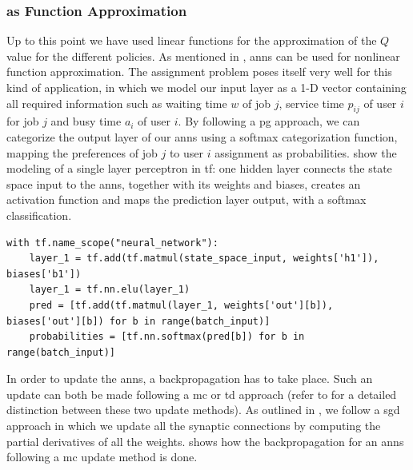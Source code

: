 \subsubsection{ as Function Approximation}

Up to this point we have used linear functions for the approximation of the $Q$ value for the different policies. As mentioned in , \glspl{ann} can be used for nonlinear function approximation. The assignment problem  poses itself very well for this kind of application, in which we model our input layer as a 1-D vector containing all required information such as waiting time $w$ of job $j$, service time $p_{ij}$ of user $i$ for job $j$ and busy time $a_i$ of user $i$. By following a \gls{pg} approach, we can categorize the output layer of our \glspl{ann} using a softmax categorization function, mapping the preferences of job $j$ to user $i$ assignment as probabilities.  show the modeling of a single layer perceptron in \gls{tf}: one hidden layer connects the state space \ie input to the \glspl{ann}, together with its weights and biases, creates an activation function and maps the prediction layer \ie output, with a softmax classification.

\begin{lstlisting}[caption={Modeling of a single perceptron in \glsentryshort{tf}, where the initial hidden layer is composed as the product between the input layer and its corresponding weights plus the corresponding biases by using an \glsentryshort{elu} activation function.},label=lst:ann_1h,style=CustomPython]
with tf.name_scope("neural_network"):
	layer_1 = tf.add(tf.matmul(state_space_input, weights['h1']), biases['b1'])
	layer_1 = tf.nn.elu(layer_1)
	pred = [tf.add(tf.matmul(layer_1, weights['out'][b]), biases['out'][b]) for b in range(batch_input)]
	probabilities = [tf.nn.softmax(pred[b]) for b in range(batch_input)]
\end{lstlisting}

In order to update the \glspl{ann}, a backpropagation has to take place. Such an update can both be made following a \gls{mc} or \gls{td} approach (refer to  for a detailed distinction between these two update methods). As outlined in , we follow a \gls{sgd} approach in which we update all the synaptic connections by computing the partial derivatives of all the weights.  shows how the backpropagation for an \glspl{ann} following a \gls{mc} update method is done.


